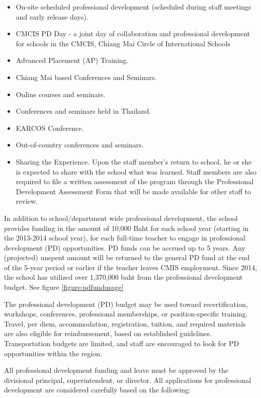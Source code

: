 \begin{itemize}
\item On-site scheduled professional development (scheduled during staff meetings and early release days).
\item CMCIS  PD Day - a joint day of collaboration and professional development for schools in the CMCIS, Chiang Mai Circle of International Schools
\item Advanced Placement (AP) Training.  
\item Chiang Mai based Conferences and Seminars. 
\item Online courses and seminars.  
\item Conferences and seminars held in Thailand. 
\item EARCOS Conference.
\item  Out-of-country conferences and seminars. 
\item Sharing the Experience.  Upon the staff member’s return to school, he or she is expected to share with the school what was learned.  Staff members are also required to file a written assessment of the program through the Professional Development Assessment Form that will be made available for other staff to review.
\end{itemize}



In addition to school/department wide professional development, the school provides funding in the amount of 10,000 Baht for each school year (starting in the 2013-2014 school year), for each full-time teacher to engage in professional development (PD) opportunities.  PD funds can be accrued up to 5 years. Any (projected) unspent amount will be returned to the general PD fund at the end of the 5-year period or earlier if the teacher leaves CMIS employment. Since 2014, the school has utilized over 1,370,000 baht from the professional development budget. See figure \ref{figure:pdfundusage}

The professional development (PD) budget may be used toward recertification, workshops, conferences, professional memberships, or position-specific training.  Travel, per diem, accommodation, registration, tuition, and required materials are also eligible for reimbursement, based on established guidelines.  Transportation budgets are limited, and staff are encouraged to look for PD opportunities within the region.  

All professional development funding and leave must be approved by the divisional principal, superintendent, or director.  All applications for professional development are considered carefully based on the following:

